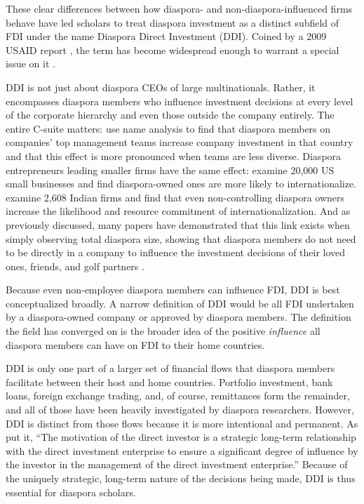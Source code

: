 \documentclass[doublespace,nopageskip]{UVAthesis}
\begin{document}
These clear differences between how diaspora- and non-diaspora-influenced firms behave have led scholars to treat diaspora investment as a distinct subfield of FDI under the name Diaspora Direct Investment (DDI). Coined by a 2009 USAID report \citep{debass_diaspora_2009}, the term has become widespread enough to warrant a special issue on it \citep{alam_iqbal_introduction_2024}.

DDI is not just about diaspora CEOs of large multinationals. Rather, it encompasses diaspora members who influence investment decisions at every level of the corporate hierarchy and even those outside the company entirely. The entire C-suite matters: \citet{coda_zabetta_foreign-origin_2025} use name analysis to find that diaspora members on companies' top management teams increase company investment in that country and that this effect is more pronounced when teams are less diverse. Diaspora entrepreneurs leading smaller firms have the same effect: \citet{inouye_counteracting_2020} examine 20,000 US small businesses and find diaspora-owned ones are more likely to internationalize. \citet{rabbiosi_diaspora_2019} examine 2,608 Indian firms and find that even non-controlling diaspora owners increase the likelihood and resource commitment of internationalization. And as previously discussed, many papers have demonstrated that this link exists when simply observing total diaspora size, showing that diaspora members do not need to be directly in a company to influence the investment decisions of their loved ones, friends, and golf partners \citep{leblang_familiarity_2010}.

Because even non-employee diaspora members can influence FDI, DDI is best conceptualized broadly. A narrow definition of DDI would be all FDI undertaken by a diaspora-owned company or approved by diaspora members. The definition the field has converged on is the broader idea of the positive \textit{influence} all diaspora members can have on FDI to their home countries.

DDI is only one part of a larger set of financial flows that diaspora members facilitate between their host and home countries. Portfolio investment, bank loans, foreign exchange trading, and, of course, remittances form the remainder, and all of those have been heavily investigated by diaspora researchers. However, DDI is distinct from those flows because it is more intentional and permanent. As \citet{naujoks_transnational_2022} put it, ``The motivation of the direct investor is a strategic long-term relationship with the direct investment enterprise to ensure a significant degree of influence by the investor in the management of the direct investment enterprise.'' Because of the uniquely strategic, long-term nature of the decisions being made, DDI is thus essential for diaspora scholars.
\end{document}
